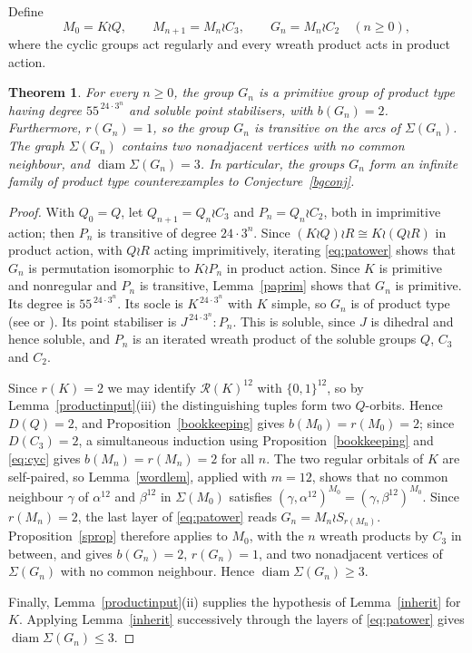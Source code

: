 \documentclass[a4paper,reqno,11pt]{amsart}
\newcommand\diam{\operatorname{diam}}
\newtheorem{thm}{Theorem}[section]
\numberwithin{equation}{section}
\begin{document}
Define
\begin{equation}\label{eq:patower}
M_0=K\wr Q,\qquad
M_{n+1}=M_n\wr C_3,\qquad
G_n=M_n\wr C_2\quad(n\ge0),
\end{equation}
where the cyclic groups act regularly and every wreath product acts in product action.

\begin{thm} \label{thm:product}
For every $n\ge0$, the group $G_n$ is a primitive group of product type having degree $55^{\,24\cdot3^n}$ and soluble point stabilisers, with $b(G_n)=2$. Furthermore, $r(G_n)=1$, so the group $G_n$ is transitive on the arcs of $\Sigma(G_n)$. The graph $\Sigma(G_n)$ contains two nonadjacent vertices with no common neighbour, and $\diam\Sigma(G_n)=3$. In particular, the groups $G_n$ form an infinite family of product type counterexamples to Conjecture~\ref{bgconj}.
\end{thm}

\begin{proof}
With $Q_0=Q$, let $Q_{n+1}=Q_n\wr C_3$ and $P_n=Q_n\wr C_2$, both in imprimitive action; then $P_n$ is transitive of degree $24\cdot3^n$. Since $(K\wr Q)\wr R\cong K\wr(Q\wr R)$ in product action, with $Q\wr R$ acting imprimitively, iterating \eqref{eq:patower} shows that $G_n$ is permutation isomorphic to $K\wr P_n$ in product action. Since $K$ is primitive and nonregular and $P_n$ is transitive, Lemma~\ref{paprim} shows that $G_n$ is primitive. Its degree is $55^{\,24\cdot3^n}$. Its socle is $K^{\,24\cdot3^n}$ with $K$ simple, so $G_n$ is of product type (see \cite{LPS} or \cite[Section~2.2]{BH}). Its point stabiliser is $J^{\,24\cdot3^n}{:}P_n$. This is soluble, since $J$ is dihedral and hence soluble, and $P_n$ is an iterated wreath product of the soluble groups $Q$, $C_3$ and $C_2$.

Since $r(K)=2$ we may identify $\mathcal R(K)^{12}$ with $\{0,1\}^{12}$, so by Lemma~\ref{productinput}(iii) the distinguishing tuples form two $Q$-orbits. Hence $D(Q)=2$, and Proposition~\ref{bookkeeping} gives $b(M_0)=r(M_0)=2$; since $D(C_3)=2$, a simultaneous induction using Proposition~\ref{bookkeeping} and \eqref{eq:cyc} gives $b(M_n)=r(M_n)=2$ for all $n$. The two regular orbitals of $K$ are self-paired, so Lemma~\ref{wordlem}, applied with $m=12$, shows that no common neighbour $\gamma$ of $\alpha^{12}$ and $\beta^{12}$ in $\Sigma(M_0)$ satisfies $(\gamma,\alpha^{12})^{M_0}=(\gamma,\beta^{12})^{M_0}$. Since $r(M_n)=2$, the last layer of \eqref{eq:patower} reads $G_n=M_n\wr S_{r(M_n)}$. Proposition~\ref{sprop} therefore applies to $M_0$, with the $n$ wreath products by $C_3$ in between, and gives $b(G_n)=2$, $r(G_n)=1$, and two nonadjacent vertices of $\Sigma(G_n)$ with no common neighbour. Hence $\diam\Sigma(G_n)\ge3$.

Finally, Lemma~\ref{productinput}(ii) supplies the hypothesis of Lemma~\ref{inherit} for $K$. Applying Lemma~\ref{inherit} successively through the layers of \eqref{eq:patower} gives $\diam\Sigma(G_n)\le 3$.
\end{proof}
\end{document}
